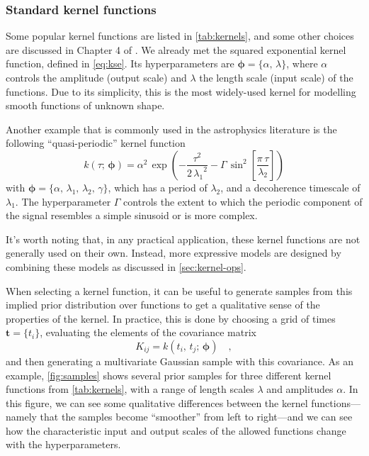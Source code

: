 \documentclass[letterpaper]{ar-1col}
\newcommand{\hyperparams}{\ensuremath{\boldsymbol{\phi}}}
\newcommand{\dt}{\ensuremath{\tau}}
\newcommand{\amplitude}{\ensuremath{\alpha}}
\newcommand{\lengthscale}{\ensuremath{\lambda}}
\begin{document}
\subsubsection{Standard kernel functions}\label{sec:standard-kernels}

Some popular kernel functions are listed in \autoref{tab:kernels}, and some other choices are discussed in Chapter 4 of \citet{gpml}. We already met the 
squared exponential kernel function, defined in \autoref{eq:kse}. Its  hyperparameters are $\hyperparams = \{\amplitude,\,\lengthscale\}$, where $\amplitude$ controls the amplitude (output scale) and $\lengthscale$ the length scale (input scale) of the functions. Due to its simplicity, this is the most widely-used kernel for modelling smooth functions of unknown shape.

Another example that is commonly used in the astrophysics literature \citep{2012MNRAS.419.3147A,2014MNRAS.443.2517H} is the following ``quasi-periodic'' kernel function
\begin{equation}
\label{eq:kqp}
  k(\dt;\,\hyperparams) = \amplitude^2\,\exp\left(-\frac{\dt^2}{2\,{\lengthscale_1}^2} -\Gamma\,\sin^2\left[\frac{\pi\,\dt}{\lengthscale_2}\right] \right)
\end{equation}
with $\hyperparams = \{\amplitude,\,\lengthscale_1,\,\lengthscale_2,\,\gamma\}$, which has a period of $\lengthscale_2$, and a decoherence timescale of $\lengthscale_1$. The hyperparameter $\Gamma$ controls the extent to which the periodic component of the signal resembles a simple sinusoid or is more complex.

It's worth noting that, in any practical application, these kernel functions are not generally used on their own.
Instead, more expressive models are designed by combining these models as discussed in \autoref{sec:kernel-ops}.

When selecting a kernel function, it can be useful to generate samples from this implied prior distribution over functions to get a qualitative sense of the properties of the kernel.
In practice, this is done by choosing a grid of times $\boldsymbol{t} = \{t_i\}$, evaluating the elements of the covariance matrix
\begin{equation}
  K_{ij} = k(t_i,\,t_j;\,\hyperparams) \quad,
\end{equation}
and then generating a multivariate Gaussian sample with this covariance.
As an example, \autoref{fig:samples} shows several prior samples for three different kernel functions from \autoref{tab:kernels}, with a range of length scales $\lengthscale$ and amplitudes $\amplitude$.
In this figure, we can see some qualitative differences between the kernel functions---namely that the samples become ``smoother'' from left to right---and we can see how the characteristic input and output scales of the allowed functions change with the hyperparameters.
\end{document}
